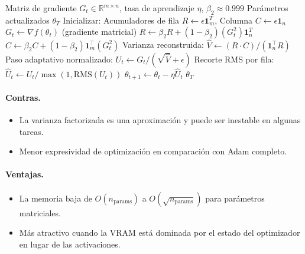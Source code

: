 \begin{algorithm}[H]
\caption{Adafactor (Estadísticas de Segundo Momento Factorizadas)}
\label{alg:adafactor}
\begin{algorithmic}[1]
\Require Matriz de gradiente $G_t \in \mathbb{R}^{m \times n}$, tasa de aprendizaje $\eta$, $\beta_2 \approx 0.999$
\Ensure Parámetros actualizados $\theta_T$
\State Inicializar: Acumuladores de fila $R \gets \epsilon \mathbf{1}^T_m$, Columna $C \gets \epsilon \mathbf{1}_n$
    \State $G_t \gets \nabla f(\theta_t)$ (gradiente matricial)
    \State $R \gets \beta_2 R + (1-\beta_2) (G_t^2) \mathbf{1}_n^T$ 
    \State $C \gets \beta_2 C + (1-\beta_2) \mathbf{1}_m^\top (G_t^2)$ 
    \State Varianza reconstruida: $\hat{V} \gets (R \cdot C) / (\mathbf{1}_n^\top R)$ 
    \State Paso adaptativo normalizado: $U_t \gets G_t / (\sqrt{\hat{V}} + \epsilon)$
    \State Recorte RMS por fila: $\hat{U}_t \gets U_t / \max(1, \text{RMS}(U_t))$
    \State $\theta_{t+1} \gets \theta_t - \eta \hat{U}_t$
\EndFor
\Return $\theta_T$
\end{algorithmic}
\end{algorithm}

\paragraph{Contras.}
\begin{itemize}[leftmargin=*]
\item La varianza factorizada es una aproximación y puede ser inestable en algunas tareas.
\item Menor expresividad de optimización en comparación con Adam completo.
\end{itemize}

\paragraph{Ventajas.}
\begin{itemize}[leftmargin=*]
\item La memoria baja de $O(n_{\text{params}})$ a $O(\sqrt{n_{\text{params}}})$ para parámetros matriciales.
\item Más atractivo cuando la VRAM está dominada por el estado del optimizador en lugar de las activaciones.
\end{itemize}


